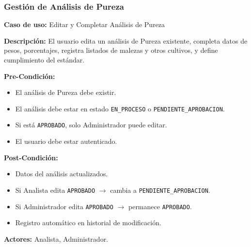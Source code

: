 \subsubsection{Gestión de Análisis de Pureza}

\noindent\textbf{Caso de uso:} Editar y Completar Análisis de Pureza

\vspace{0.5em}
\noindent\textbf{Descripción:} El usuario edita un análisis de Pureza existente, completa datos de pesos, porcentajes, registra listados de malezas y otros cultivos, y define cumplimiento del estándar.

\vspace{0.5em}
\noindent\textbf{Pre-Condición:}
\begin{itemize}[nosep]
    \item El análisis de Pureza debe existir.
    \item El análisis debe estar en estado \texttt{EN\_PROCESO} o \texttt{PENDIENTE\_APROBACION}.
    \item Si está \texttt{APROBADO}, solo Administrador puede editar.
    \item El usuario debe estar autenticado.
\end{itemize}

\vspace{0.5em}
\noindent\textbf{Post-Condición:}
\begin{itemize}[nosep]
    \item Datos del análisis actualizados.
    \item Si Analista edita \texttt{APROBADO} $\rightarrow$ cambia a \texttt{PENDIENTE\_APROBACION}.
    \item Si Administrador edita \texttt{APROBADO} $\rightarrow$ permanece \texttt{APROBADO}.
    \item Registro automático en historial de modificación.
\end{itemize}

\vspace{0.5em}
\noindent\textbf{Actores:} Analista, Administrador.

